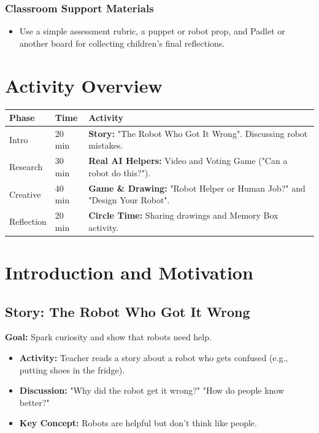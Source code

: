 \documentclass[11pt, a4paper]{article}
\begin{document}
\subsubsection*{Classroom Support Materials}
\begin{itemize}
    \item Use a simple assessment rubric, a puppet or robot prop, and Padlet or another board for collecting children's final reflections.
\end{itemize}

\section*{Activity Overview}
\begingroup
\small
\begin{tabularx}{\textwidth}{|l|l|L|}
    \hline
     \textbf{Phase} & \textbf{Time} & \textbf{Activity} \\ \hline
    Intro & 20 min & \textbf{Story:} "The Robot Who Got It Wrong". Discussing robot mistakes. \\ \hline
    Research & 30 min & \textbf{Real AI Helpers:} Video and Voting Game ("Can a robot do this?"). \\ \hline
    Creative & 40 min & \textbf{Game \& Drawing:} "Robot Helper or Human Job?" and "Design Your Robot". \\ \hline
    Reflection & 20 min & \textbf{Circle Time:} Sharing drawings and Memory Box activity. \\ \hline
\end{tabularx}
\endgroup

\section{Introduction and Motivation}
\subsection{Story: The Robot Who Got It Wrong}
\textbf{Goal:} Spark curiosity and show that robots need help.
\begin{itemize}
    \item \textbf{Activity:} Teacher reads a story about a robot who gets confused (e.g., putting shoes in the fridge).
    \item \textbf{Discussion:} "Why did the robot get it wrong?" "How do people know better?"
    \item \textbf{Key Concept:} Robots are helpful but don't think like people.
\end{itemize}
\end{document}

